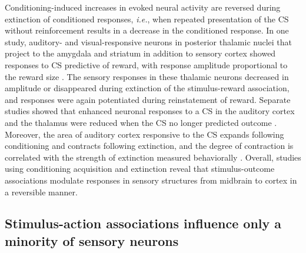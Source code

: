 Conditioning-induced increases in evoked neural activity are reversed during extinction of conditioned responses, \emph{i.e.}, when repeated presentation of the CS without reinforcement results in a decrease in the conditioned response.
In one study, auditory- and visual-responsive neurons in posterior thalamic nuclei that project to the amygdala and striatum in addition to sensory cortex showed responses to CS predictive of reward, with response amplitude proportional to the reward size \citep{Komura2001}. The sensory responses in these thalamic neurons decreased in amplitude or disappeared during extinction of the stimulus-reward association, and responses were again potentiated during reinstatement of reward. Separate studies showed that enhanced neuronal responses to a CS in the auditory cortex and the thalamus were reduced when the CS no longer predicted outcome \citep{Gabriel1976, Edeline1990}. 
Moreover, the area of auditory cortex responsive to the CS expands following conditioning and contracts following extinction, and the degree of contraction is correlated with the strength of extinction measured behaviorally \citep{Bieszczad2012}.
Overall, studies using conditioning acquisition and extinction reveal that stimulus-outcome associations modulate responses in sensory structures from midbrain to cortex in a reversible manner.

\subsection{Stimulus-action associations influence only a minority of sensory neurons}

